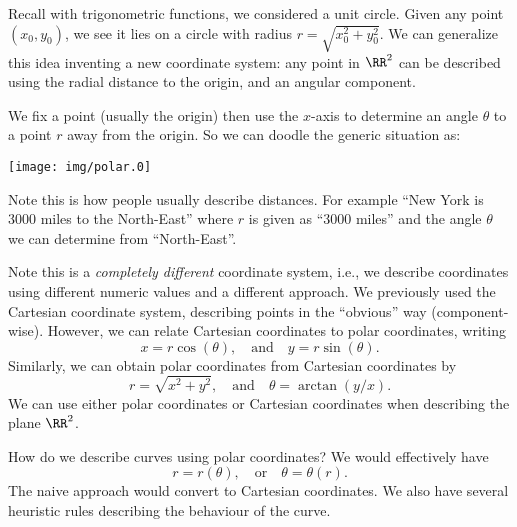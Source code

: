 
\M
Recall with trigonometric functions, we considered a unit
circle. Given any point $(x_{0}, y_{0})$, we see it lies on a
circle with radius $r=\sqrt{x_{0}^{2}+y_{0}^{2}}$. We can
generalize this idea inventing a new coordinate system: any point
in $\RR^{2}$ can be described using the radial distance to the
origin, and an angular component.

\M
We fix a point (usually the origin) then use the $x$-axis to
determine an angle $\theta$ to a point $r$ away from the
origin. So we can doodle the generic situation as:
\begin{center}
\texttt{[image: img/polar.0]}
\end{center}
Note this is how people usually describe distances. For example
``New York is 3000 miles to the North-East'' where $r$ is given
as ``3000 miles'' and the angle $\theta$ we can determine from
``North-East''. 

Note this is a \emph{completely different} coordinate system,
i.e., we describe coordinates using different numeric values and
a different approach. We previously used the Cartesian coordinate
system, describing points in the ``obvious'' way
(component-wise). However, we can relate Cartesian coordinates to
polar coordinates, writing
\begin{equation}\label{eq:cartInPolar}
x=r\cos(\theta),\quad\mbox{and}\quad y=r\sin(\theta).
\end{equation}
Similarly, we can obtain polar coordinates from Cartesian
coordinates by
\begin{equation}
r=\sqrt{x^{2}+y^{2}},\quad\mbox{and}\quad \theta=\arctan(y/x).
\end{equation}
We can use either polar coordinates or Cartesian coordinates when
describing the plane $\RR^2$.

\M
How do we describe curves using polar coordinates? We would
effectively have
\begin{equation}
r=r(\theta),\quad\mbox{or}\quad \theta=\theta(r).
\end{equation}
The naive approach would convert to Cartesian coordinates. We
also have several heuristic rules describing the behaviour of the
curve. 

